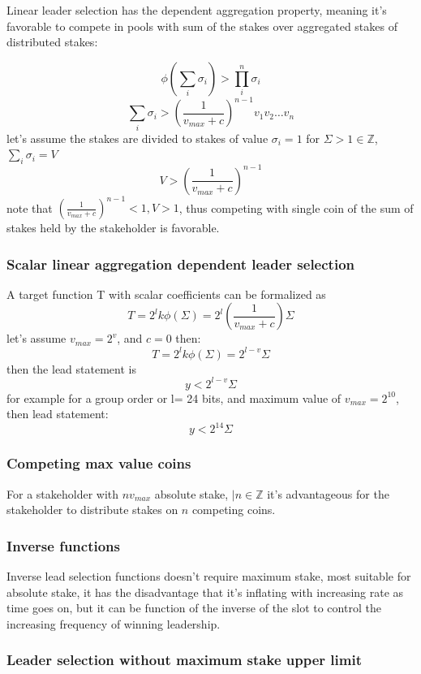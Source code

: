 \documentclass{article}
\begin{document}
Linear leader selection has the dependent aggregation property, meaning
it's favorable to compete in pools with sum of the stakes over aggregated
stakes of distributed stakes:

$$\phi(\sum_{i}{\sigma_i})>\prod_{i}^{n}{\sigma_i}$$
$$\sum_{i}{\sigma_i}>(\frac{1}{v_{max}+c})^{n-1}v_1v_2 \dots
v_n$$ let's assume the stakes are divided to stakes of value
$\sigma_i=1$ for $\Sigma>1 \in \mathbb{Z}$, $\sum_{i}{\sigma_i}=V$
$$V>(\frac{1}{v_{max}+c})^{n-1}$$ note that $(\frac{1}{v_{max}+c})^{n-1}
< 1, V>1$, thus competing with single coin of the sum of stakes held by
the stakeholder is favorable.

\subsubsection{ Scalar linear aggregation dependent leader selection}

A target function T with scalar coefficients can be formalized as
$$T=2^lk\phi(\Sigma)=2^l(\frac{1}{v_{max}+c})\Sigma$$ let's assume
$v_{max}=2^v$, and $c=0$ then: $$T=2^lk\phi(\Sigma)=2^{l-v}\Sigma$$
then the lead statement is $$y<2^{l-v}\Sigma$$ for example for a group
order or l=    24 bits, and maximum value of $v_{max}=2^{10}$, then
lead statement: $$y<2^{14}\Sigma$$

\subsubsection{ Competing max value coins}

For a stakeholder with $nv_{max}$ absolute stake, $\mid n \in \mathbb{Z}$
it's advantageous for the stakeholder to distribute stakes on $n$
competing coins.

\subsubsection{ Inverse functions}

Inverse lead selection functions doesn't require maximum stake, most
suitable for absolute stake, it has the disadvantage that it's inflating
with increasing rate as time goes on, but it can be function of the
inverse of the slot to control the increasing frequency of winning
leadership.

\subsubsection{ Leader selection without maximum stake upper limit}
\end{document}
